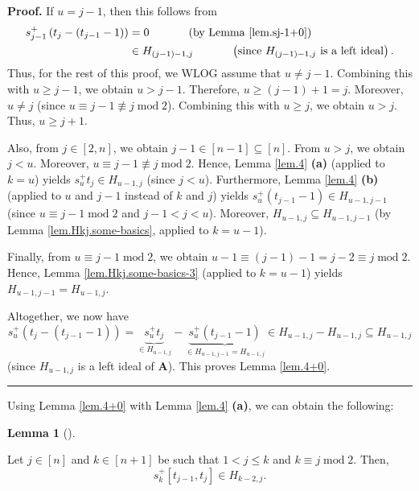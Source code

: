 \documentclass[numbers=enddot,12pt,final,onecolumn,notitlepage]{scrartcl}%
\theoremstyle{definition}
\newtheorem{lem}[theo]{Lemma}
\newenvironment{lemma}[1][]
{\begin{lem}[#1]\begin{leftbar}}
{\end{leftbar}\end{lem}}
\newenvironment{proof}[1][Proof]{\noindent\textbf{#1.} }{\ \rule{0.5em}{0.5em}}
\begin{document}
\begin{proof}
If $u=j-1$, then this follows from
\begin{align*}
s_{j-1}^{+}\left(  t_{j}-\left(  t_{j-1}-1\right)  \right)   &
=0\ \ \ \ \ \ \ \ \ \ \left(  \text{by Lemma \ref{lem.sj-1+0}}\right) \\
&  \in H_{\left(  j-1\right)  -1,j}\ \ \ \ \ \ \ \ \ \ \left(  \text{since
}H_{\left(  j-1\right)  -1,j}\text{ is a left ideal}\right)  .
\end{align*}
Thus, for the rest of this proof, we WLOG assume that $u\neq j-1$. Combining
this with $u\geq j-1$, we obtain $u>j-1$. Therefore, $u\geq\left(  j-1\right)
+1=j$. Moreover, $u\neq j$ (since $u\equiv j-1\not \equiv j\operatorname{mod}%
2$). Combining this with $u\geq j$, we obtain $u>j$. Thus, $u\geq j+1$.

Also, from $j\in\left[  2,n\right]  $, we obtain $j-1\in\left[  n-1\right]
\subseteq\left[  n\right]  $. From $u>j$, we obtain $j<u$. Moreover, $u\equiv
j-1\not \equiv j\operatorname{mod}2$. Hence, Lemma \ref{lem.4} \textbf{(a)}
(applied to $k=u$) yields $s_{u}^{+}t_{j}\in H_{u-1,j}$ (since $j<u$).
Furthermore, Lemma \ref{lem.4} \textbf{(b)} (applied to $u$ and $j-1$ instead
of $k$ and $j$) yields $s_{u}^{+}\left(  t_{j-1}-1\right)  \in H_{u-1,j-1}$
(since $u\equiv j-1\operatorname{mod}2$ and $j-1<j<u$). Moreover,
$H_{u-1,j}\subseteq H_{u-1,j-1}$ (by Lemma \ref{lem.Hkj.some-basics}, applied
to $k=u-1$).

Finally, from $u\equiv j-1\operatorname{mod}2$, we obtain $u-1\equiv\left(
j-1\right)  -1=j-2\equiv j\operatorname{mod}2$. Hence, Lemma
\ref{lem.Hkj.some-basics-3} (applied to $k=u-1$) yields $H_{u-1,j-1}%
=H_{u-1,j}$.

Altogether, we now have
\[
s_{u}^{+}\left(  t_{j}-\left(  t_{j-1}-1\right)  \right)  =\underbrace{s_{u}%
^{+}t_{j}}_{\in H_{u-1,j}}-\underbrace{s_{u}^{+}\left(  t_{j-1}-1\right)
}_{\in H_{u-1,j-1}=H_{u-1,j}}\in H_{u-1,j}-H_{u-1,j}\subseteq H_{u-1,j}%
\]
(since $H_{u-1,j}$ is a left ideal of $\mathbf{A}$). This proves Lemma
\ref{lem.4+0}.
\end{proof}

Using Lemma \ref{lem.4+0} with Lemma \ref{lem.4} \textbf{(a)}, we can obtain
the following:

\begin{lemma}
\label{lem.5}Let $j\in\left[  n\right]  $ and $k\in\left[  n+1\right]  $ be
such that $1<j\leq k$ and $k\equiv j\operatorname{mod}2$. Then,%
\[
s_{k}^{+}\left[  t_{j-1},t_{j}\right]  \in H_{k-2,j}.
\]

\end{lemma}
\end{document}
